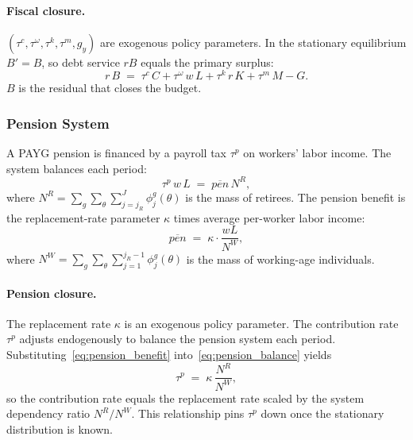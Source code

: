 \documentclass[12pt,a4paper]{article}
\begin{document}
\paragraph{Fiscal closure.}
$(\tau^c, \tau^\omega, \tau^k, \tau^m, g_y)$ are exogenous policy parameters. In the stationary equilibrium $B' = B$, so debt service $r B$ equals the primary surplus:
\begin{equation}
\label{eq:gov_stationary}
r\, B \;=\; \tau^c\, C + \tau^\omega\, w\, L + \tau^k\, r\, K + \tau^m\, M - G.
\end{equation}
$B$ is the residual that closes the budget.

\subsubsection{Pension System}
\label{subsubsec:pension}
A PAYG pension is financed by a payroll tax $\tau^p$ on workers' labor income. The system balances each period:
\begin{equation}
\label{eq:pension_balance}
\tau^p\, w\, L \;=\; \overline{pen}\, N^R,
\end{equation}
where $N^R = \sum_g \sum_\theta \sum_{j=j_R}^{J} \phi_j^{g}(\theta)$ is the mass of retirees. The pension benefit is the replacement-rate parameter $\kappa$ times average per-worker labor income:
\begin{equation}
\label{eq:pension_benefit}
\overline{pen} \;=\; \kappa \cdot \frac{w L}{N^W},
\end{equation}
where $N^W = \sum_g \sum_\theta \sum_{j=1}^{j_R - 1} \phi_j^{g}(\theta)$ is the mass of working-age individuals.

\paragraph{Pension closure.}
The replacement rate $\kappa$ is an exogenous policy parameter. The contribution rate $\tau^p$ adjusts endogenously to balance the pension system each period. Substituting~\eqref{eq:pension_benefit} into~\eqref{eq:pension_balance} yields
\begin{equation}
\label{eq:pension_contribution}
\tau^p \;=\; \kappa\, \frac{N^R}{N^W},
\end{equation}
so the contribution rate equals the replacement rate scaled by the system dependency ratio $N^R / N^W$. This relationship pins $\tau^p$ down once the stationary distribution is known.
\end{document}
